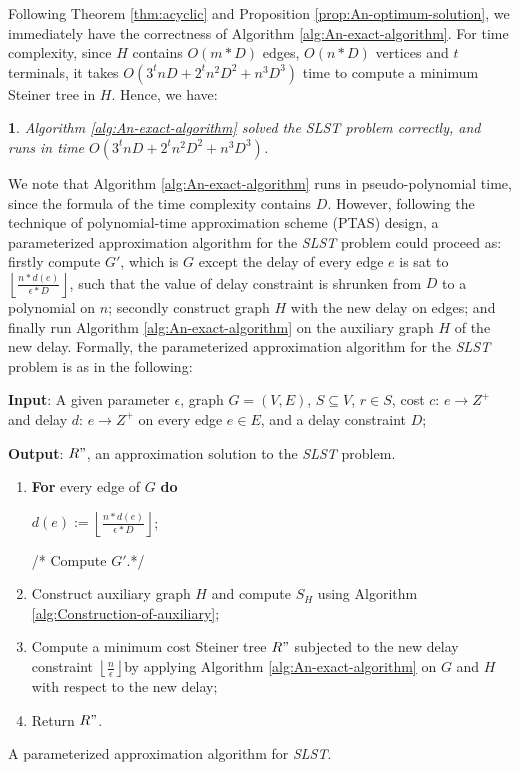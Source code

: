 \documentclass[english,runningheads,a4paper]{llncs}
\newtheorem{thm}{\protect\theoremname}
\providecommand{\theoremname}{Theorem}
\begin{document}
Following Theorem \ref{thm:acyclic} and Proposition \ref{prop:An-optimum-solution},
we immediately have the correctness of Algorithm \ref{alg:An-exact-algorithm}.
For time complexity, since $H$ contains $O(m*D)$ edges, $O(n*D)$
vertices and $t$ terminals, it takes $O(3^{t}nD+2^{t}n^{2}D^{2}+n^{3}D^{3})$
time to compute a minimum Steiner tree in $H$. Hence, we have:
\begin{thm}
\label{thm:best-1}Algorithm \ref{alg:An-exact-algorithm} solved
the SLST problem correctly, and runs in time $O(3^{t}nD+2^{t}n^{2}D^{2}+n^{3}D^{3})$.
\end{thm}
We note that Algorithm \ref{alg:An-exact-algorithm} runs in pseudo-polynomial
time, since the formula of the time complexity contains $D$. However,
following the technique of polynomial-time approximation scheme (PTAS)
design, a parameterized approximation algorithm for the \emph{SLST}
problem could proceed as: firstly compute $G'$, which is $G$ except
the delay of every edge $e$ is sat to $\left\lfloor \frac{n*d(e)}{\epsilon*D}\right\rfloor $,
such that the value of delay constraint is shrunken from $D$ to a
polynomial on $n$; secondly construct graph $H$ with the new delay
on edges; and finally run Algorithm \ref{alg:An-exact-algorithm}
on the auxiliary graph $H$ of the new delay. Formally, the parameterized
approximation algorithm for the\emph{ SLST }problem is as in the following:

\begin{algorithm}
\textbf{Input}: A given parameter $\epsilon$, graph $G=(V,E)$, $S\subseteq V$,
$r\in S$, cost $c:\, e\rightarrow Z^{+}$and delay $d:\, e\rightarrow Z^{+}$
on every edge $e\in E$, and a delay constraint $D$;

\textbf{Output}: $R"$, an approximation solution to the \emph{SLST}
problem.
\begin{enumerate}
\item \textbf{For} every edge of $G$ \textbf{do}


\quad{}$d(e):=\left\lfloor \frac{n*d(e)}{\epsilon*D}\right\rfloor $;


/{*} Compute $G'$.{*}/

\item Construct auxiliary graph $H$ and compute $S_{H}$ using Algorithm
\ref{alg:Construction-of-auxiliary};
\item Compute a minimum cost Steiner tree $R"$ subjected to the new delay
constraint $\left\lfloor \frac{n}{\epsilon}\right\rfloor $by applying
Algorithm \ref{alg:An-exact-algorithm} on $G$ and $H$ with respect
to the new delay;
\item Return $R"$.
\end{enumerate}
\caption{\label{alg:appro-algorithm-1}A parameterized approximation algorithm
for \emph{SLST}.}
\end{algorithm}
\end{document}
